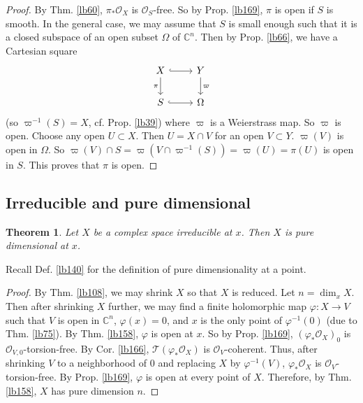 \documentclass[12pt,b5paper,notitlepage]{report}
\theoremstyle{definition}
\theoremstyle{plain}
\newtheorem{thm}[df]{Theorem}
\newcommand{\scr}{\mathscr}
\newcommand{\Cbb}{\mathbb C}
\numberwithin{equation}{section}
\begin{document}
\begin{proof}
By Thm. \ref{lb60}, $\pi_*\scr O_X$ is $\scr O_S$-free. So by Prop. \ref{lb169}, $\pi$ is open if $S$ is smooth. In the general case, we may assume that $S$ is small enough such that it is a closed subspace of an open subset $\Omega$ of $\Cbb^n$. Then by Prop. \ref{lb66}, we have a Cartesian square
\begin{equation}
\begin{tikzcd}
X \arrow[r, hook] \arrow[d, "\pi"'] & Y \arrow[d, "\varpi"] \\
S \arrow[r, hook]                   & \Omega               
\end{tikzcd}
\end{equation} 
(so $\varpi^{-1}(S)=X$, cf. Prop. \ref{lb39}) where $\varpi$ is a Weierstrass map. So $\varpi$ is open. Choose any open $U\subset X$. Then $U=X\cap V$ for an open $V\subset Y$. $\varpi(V)$ is open in $\Omega$. So $\varpi(V)\cap S=\varpi(V\cap \varpi^{-1}(S))=\varpi(U)=\pi(U)$ is open in $S$. This proves that $\pi$ is open.
\end{proof}



\subsection{Irreducible and pure dimensional}

\begin{thm}\label{lb170}
Let $X$ be a complex space irreducible at $x$. Then $X$ is pure dimensional at $x$.
\end{thm}


Recall Def. \ref{lb140} for the definition of pure dimensionality at a point.


\begin{proof}
By Thm. \ref{lb108}, we may shrink $X$ so that $X$ is reduced. Let $n=\dim_xX$. Then after shrinking $X$ further, we may find a finite holomorphic map $\varphi:X\rightarrow V$ such that $V$ is open in $\Cbb^n$, $\varphi(x)=0$, and $x$ is the only point of $\varphi^{-1}(0)$ (due to Thm. \ref{lb75}). By Thm. \ref{lb158}, $\varphi$ is open at $x$. So by Prop. \ref{lb169}, $(\varphi_*\scr O_X)_0$ is $\scr O_{V,0}$-torsion-free.  By Cor. \ref{lb166}, $\scr T(\varphi_*\scr O_X)$ is $\scr O_V$-coherent. Thus, after shrinking $V$ to a neighborhood of $0$ and replacing $X$ by $\varphi^{-1}(V)$, $\varphi_*\scr O_X$ is $\scr O_V$-torsion-free. By Prop. \ref{lb169}, $\varphi$ is open at every point of $X$. Therefore, by Thm. \ref{lb158}, $X$ has pure dimension $n$. 
\end{proof}
\end{document}
